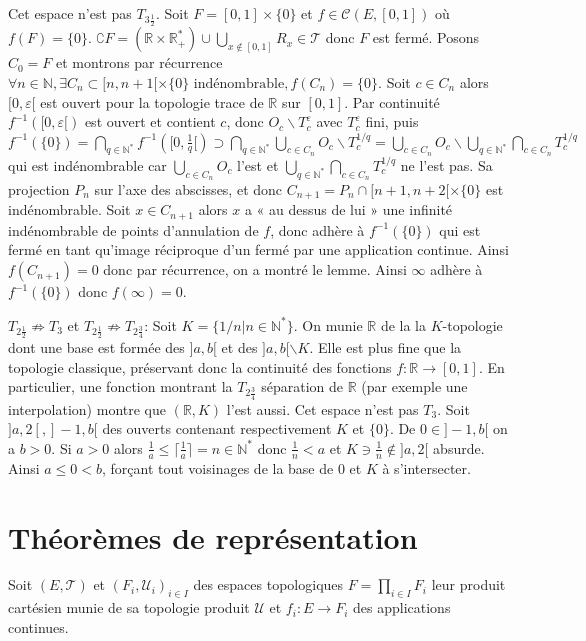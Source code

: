 \documentclass[a4paper, 11pt, french]{book}
\newenvironment{itemise}{\itemize}{\enditemize}
\theoremstyle{plain} %
\theoremstyle{definition} %
\theoremstyle{remark} %
\renewcommand{\setminus}{\backslash}
\newcommand{\1}{\mathds{1}}
\newcommand{\cont}{\mathcal{C}}
\newcommand{\infegal}{\leqslant}
\newcommand{\inv}[1]{#1^{-1}}
\newcommand{\N}{\mathbb{N}}
\newcommand{\R}{\mathbb{R}}
\begin{document}
\begin{itemise}
	Cet espace n'est pas $T_{3\frac{1}{2}}$.
	Soit $F=[0, 1]\times\{0\}$ et $f\in\cont(E, [0, 1])$ où $f(F)=\{0\}$.
	$\complement F=(\R\times\R_+^*)\cup\bigcup_{x\notin[0, 1]}R_x\in\mathscr{T}$ donc $F$ est fermé.
	Posons $C_0=F$ et montrons par récurrence $\forall n\in\N, \exists C_n\subset [n, n+1[\times\{0\}\text{ indénombrable}, f(C_n)=\{0\}$.
	Soit $c\in C_n$ alors $[0, \varepsilon[$ est ouvert pour la topologie trace de $\R$ sur $[0, 1]$.
	Par continuité $\inv{f}([0, \varepsilon[)$ est ouvert et contient $c$, donc $O_c\setminus T_c^\varepsilon$ avec $T_c^\varepsilon$ fini, puis $\inv{f}(\{0\})=\bigcap_{q\in\N^*}\inv{f}([0,\frac{1}{q}[)\supset\bigcap_{q\in\N^*}\bigcup_{c\in C_n}O_c\setminus T_c^{1/q}=\bigcup_{c\in C_n}O_c\setminus\bigcup_{q\in\N^*}\bigcap_{c\in C_n}T_c^{1/q}$ qui est indénombrable car $\bigcup_{c\in C_n}O_c$ l'est et $\bigcup_{q\in\N^*}\bigcap_{c\in C_n}T_c^{1/q}$ ne l'est pas.
	Sa projection $P_n$ sur l'axe des abscisses, et donc $C_{n+1}=P_n\cap[n+1, n+2[\times\{0\}$ est indénombrable.
	Soit $x\in C_{n+1}$ alors $x$ a « au dessus de lui » une infinité indénombrable de points d'annulation de $f$, donc adhère à $\inv{f}(\{0\})$ qui est fermé en tant qu'image réciproque d'un fermé par une application continue.
	Ainsi $f(C_{n+1})=0$ donc par récurrence, on a montré le lemme.
	Ainsi $\infty$ adhère à $\inv{f}(\{0\})$ donc $f(\infty)=0$.
	\item[$T_{2\frac{1}{2}}\not\Rightarrow T_3$ et $T_{2\frac{1}{2}}\not\Rightarrow T_{2\frac{3}{4}}$:]
	Soit $K=\{1/n|n\in\N^*\}$.
	On munie $\R$ de la la $K$-topologie dont une base est formée des $]a, b[$ et des $]a, b[\setminus K$.
	Elle est plus fine que la topologie classique, préservant donc la continuité des fonctions $f:\R\rightarrow[0, 1]$.
	En particulier, une fonction montrant la $T_{2\frac{3}{4}}$ séparation de $\R$ (par exemple une interpolation) montre que $(\R, K)$ l'est aussi.
	Cet espace n'est pas $T_3$.
	Soit $]a, 2[, ]-1, b[$ des ouverts contenant respectivement $K$ et $\{0\}$.
	De $0\in]-1, b[$ on a $b>0$.
	Si $a>0$ alors $\frac{1}{a}\infegal \lceil\frac{1}{a}\rceil=n\in\N^*$ donc $\frac{1}{n}<a$ et $K\ni\frac{1}{n}\notin]a, 2[$ absurde.
	Ainsi $a\infegal0<b$, forçant tout voisinages de la base de $0$ et $K$ à s'intersecter.
\end{itemise}

\section{Théorèmes de représentation}
Soit $(E, \mathscr{T})$ et $(F_i, \mathscr{U}_i)_{i\in I}$ des espaces topologiques $F=\prod_{i\in I}F_i$ leur produit cartésien munie de sa topologie produit $\mathscr{U}$ et $f_i:E\rightarrow F_i$ des applications continues.
\end{document}
